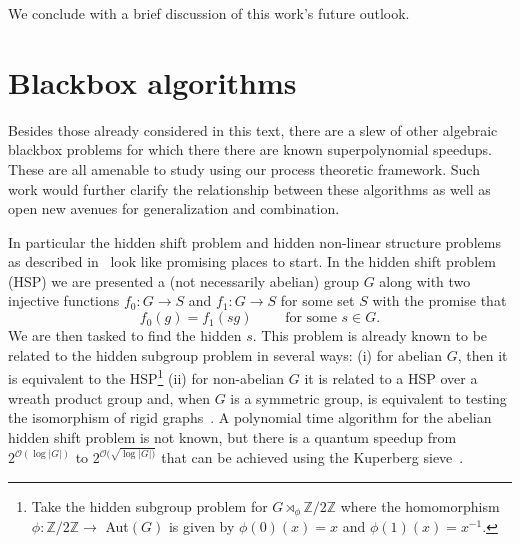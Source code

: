 We conclude with a brief discussion of this work's future outlook.

\section{Blackbox algorithms}

Besides those already considered in this text, there are a slew of other algebraic blackbox problems for which there there are known superpolynomial speedups. These are all amenable to study using our process theoretic framework. Such work would further clarify the relationship between these algorithms as well as open new avenues for generalization and combination.

In particular the hidden shift problem and hidden non-linear structure problems as described in~\cite{childs2010quantum} look like promising places to start. In the hidden shift problem (HSP) we are presented a (not necessarily abelian) group $G$ along with two injective functions $f_0:G\to S$ and $f_1:G\to S$ for some set $S$ with the promise that
\begin{equation}
f_0(g) = f_1(sg) \qquad \mbox{ for some }s\in G.
\end{equation}
We are then tasked to find the hidden $s$. This problem is already known to be related to the hidden subgroup problem in several ways: (i) for abelian $G$, then it is equivalent to the HSP\footnote{Take the hidden subgroup problem for $G\rtimes_{\phi}\mathbb{Z}/2\mathbb{Z}$ where the homomorphism $\phi:\mathbb{Z}/2\mathbb{Z}\to$ Aut$(G)$ is given by $\phi(0)(x)= x$ and $\phi(1)(x)=x^{-1}$.} (ii) for non-abelian $G$ it is related to a HSP over a wreath product group and, when $G$ is a symmetric group, is equivalent to testing the isomorphism of rigid graphs~\cite{childs2010quantum}. A polynomial time algorithm for the abelian hidden shift problem is not known, but there is a quantum speedup from $2^{\mathcal{O}(\log |G|)}$ to $2^{\mathcal{O}(\sqrt{\log |G|)}}$ that can be achieved using the Kuperberg sieve~\cite{childs2010quantum,kuperberg2005subexponential}.

